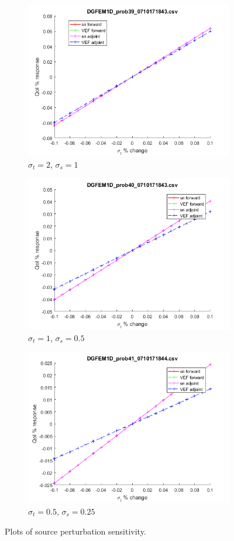 \documentclass{article}
\newcommand{\sigt}{\sigma_t}
\newcommand{\sigs}{\sigma_s}
\begin{document}
\begin{figure}[H]
\label{InHomoPertq}
\begin{subfigure}{.5\textwidth}
  \centering
  \includegraphics[width=.8\linewidth]{figures/39qSens.png}
  \caption{$\sigt=2$, $\sigs=1$}
  \label{fig:sfig1}
\end{subfigure}%
\begin{subfigure}{.5\textwidth}
  \centering
  \includegraphics[width=.8\linewidth]{figures/40qSens.png}
  \caption{$\sigt=1$, $\sigs=0.5$}
  \label{fig:sfig2}
\end{subfigure}
\begin{subfigure}{.5\textwidth}
  \centering
  \includegraphics[width=.8\linewidth]{figures/41qSens.png}
  \caption{$\sigt=0.5$, $\sigs=0.25$}
  \label{fig:sfig3}
\end{subfigure}
\caption{Plots of source perturbation sensitivity.}
\label{fig:fig}
\end{figure}
\end{document}
